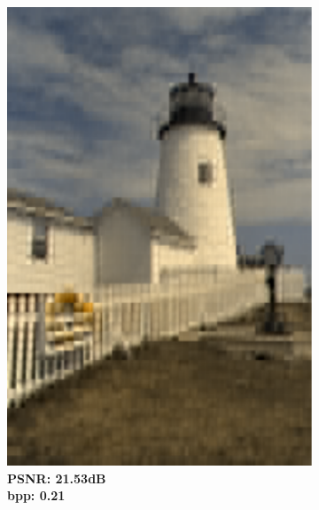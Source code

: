 \begin{figure}[t]
\begin{subfigure}{.2\textwidth}
		\includegraphics[width=.95\textwidth]{figures/kodim19_SVD_bpp_0.190_psnr_22.111.pdf}
        \caption*{\tiny \textbf{PSNR: 21.53dB \\ bpp: 0.21}}
	\end{subfigure}%
    \begin{subfigure}{.2\textwidth}
		\centering

\end{subfigure}
\end{figure}
